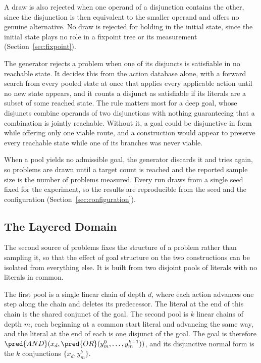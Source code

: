     A draw is also rejected when one operand of a disjunction contains the other, since the disjunction is then equivalent to the smaller operand and offers no genuine alternative.
    No draw is rejected for holding in the initial state, since the initial state plays no role in a fixpoint tree or its measurement (Section~\ref{sec:fixpoint}).

    The generator rejects a problem when one of its disjuncts is satisfiable in no reachable state.
    It decides this from the action database alone, with a forward search from every pooled state at once that applies every applicable action until no new state appears, and it counts a disjunct as satisfiable if its literals are a subset of some reached state.
    The rule matters most for a deep goal, whose disjuncts combine operands of two disjunctions with nothing guaranteeing that a combination is jointly reachable.
    Without it, a goal could be disjunctive in form while offering only one viable route, and a construction would appear to preserve every reachable state while one of its branches was never viable.

    When a pool yields no admissible goal, the generator discards it and tries again, so problems are drawn until a target count is reached and the reported sample size is the number of problems measured.
    Every run draws from a single seed fixed for the experiment, so the results are reproducible from the seed and the configuration (Section~\ref{sec:configuration}).

    \subsection{The Layered Domain}
    \label{subsec:layered_domain}
    The second source of problems fixes the structure of a problem rather than sampling it, so that the effect of goal structure on the two constructions can be isolated from everything else.
    It is built from two disjoint pools of literals with no literals in common.

    

    The first pool is a single linear chain of depth $d$, where each action advances one step along the chain and deletes its predecessor.
    The literal at the end of this chain is the shared conjunct of the goal.
    The second pool is $k$ linear chains of depth $m$, each beginning at a common start literal and advancing the same way, and the literal at the end of each is one disjunct of the goal.
    The goal is therefore $\pred{AND}(x_d, \pred{OR}(y^0_m, \ldots, y^{k-1}_m))$, and its disjunctive normal form is the $k$ conjunctions $\{x_d, y^b_m\}$.

